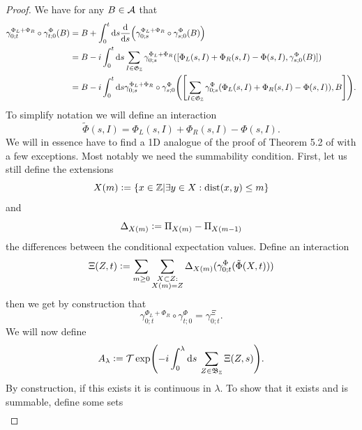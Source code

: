 \documentclass[11pt,a4paper,twoside]{article}
\numberwithin{equation}{section}
\begin{document}
	\begin{proof}
		We have for any $B\in\AA$ that
		\begin{align}
			\gamma^{\Phi_L+\Phi_R}_{0;t}\circ\gamma^\Phi_{t;0}(B)&=B+\int_{0}^{t}\d s\frac{\d}{\d s}\left(\gamma^{\Phi_L+\Phi_R}_{0;s}\circ\gamma^\Phi_{s;0}(B)\right)\\
			&=B-i\int_{0}^{t}\d s\sum_{I\in\mathfrak{G}_\ZZ}\gamma^{\Phi_L+\Phi_R}_{0;s}([\Phi_L(s,I)+\Phi_R(s,I)-\Phi(s,I),\gamma^{\Phi}_{s;0}(B)])\\
			\label{eq:EquationShowingBounded_H}
			&=B-i\int_{0}^{t}\d s\gamma^{\Phi_L+\Phi_R}_{0;s}\circ\gamma^{\Phi}_{s;0}\left(\left[\sum_{I\in\mathfrak{G}_\ZZ}\gamma^{\Phi}_{0;s}(\Phi_L(s,I)+\Phi_R(s,I)-\Phi(s,I)),B\right]\right).
		\end{align}
		To simplify notation we will define an interaction
		\begin{equation}
			\tilde\Phi(s,I)=\Phi_L(s,I)+\Phi_R(s,I)-\Phi(s,I).
		\end{equation}
		We will in essence have to find a 1D analogue of the proof of Theorem 5.2 of \cite{ogata2021h3gmathbb} with a few exceptions. Most notably we need the summability condition. First, let us still define the extensions
		\begin{equation}
			X(m)\defeq \{x\in\ZZ|\exists y\in X:\textrm{dist}(x,y)\leq m\}
		\end{equation}
		and
		\begin{equation}
			\Delta_{X(m)}\defeq \Pi_{X(m)}-\Pi_{X(m-1)}
		\end{equation}
		the differences between the conditional expectation values. Define an interaction
		\begin{equation}\label{eq:RecastingTheInteraction}
			\Xi(Z,t)\defeq\sum_{m\geq 0}\sum_{\substack{X\subset Z:\\X(m)=Z}}\Delta_{X(m)}(\gamma^{\Phi}_{0;t}(\tilde{\Phi}(X,t)))
		\end{equation}
		then we get by construction that
		\begin{equation}
			\gamma^{\Phi_L+\Phi_R}_{0;t}\circ\gamma^{\Phi}_{t;0}=\gamma^{\Xi}_{0;t}.
		\end{equation}
		We will now define
		\begin{equation}
			A_\lambda\defeq \mathcal{T}\exp(-i\int_0^\lambda \d s\: \sum_{Z\in\mathfrak{B}_{\ZZ}}\Xi(Z,s)).
		\end{equation}
		By construction, if this exists it is continuous in $\lambda$. To show that it exists and is summable, define some sets
		\begin{align}

\end{align}
\end{proof}
\end{document}
